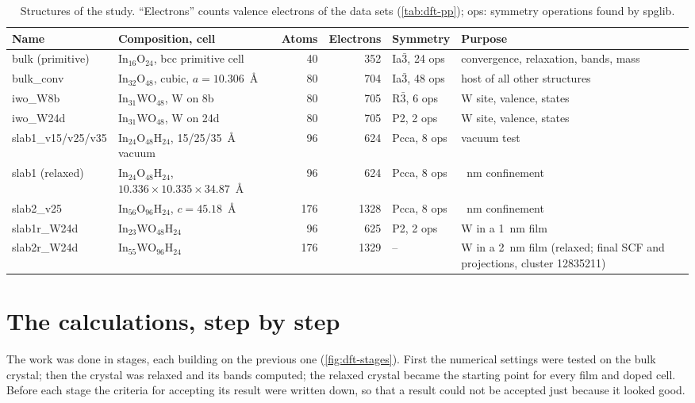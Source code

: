 \begin{table}[htbp]\centering\footnotesize
\caption{Structures of the study. ``Electrons'' counts valence electrons of the data sets (\cref{tab:dft-pp}); ops:
symmetry operations found by spglib.}
\label{tab:dft-structures}
\begin{tabularx}{\linewidth}{@{}l>{\raggedright\arraybackslash}Xrrl>{\raggedright\arraybackslash}p{3.6cm}@{}}
\toprule
Name & Composition, cell & Atoms & Electrons & Symmetry & Purpose \\
\midrule
bulk (primitive) & In$_{16}$O$_{24}$, bcc primitive cell & 40 & 352 & Ia$\bar{3}$, 24 ops & convergence, relaxation, bands, mass \\
bulk\_conv & In$_{32}$O$_{48}$, cubic, $a = 10.306$~\AA & 80 & 704 & Ia$\bar{3}$, 48 ops & host of all other structures \\
iwo\_W8b & In$_{31}$WO$_{48}$, W on 8b & 80 & 705 & R$\bar{3}$, 6 ops & W site, valence, states \\
iwo\_W24d & In$_{31}$WO$_{48}$, W on 24d & 80 & 705 & P2, 2 ops & W site, valence, states \\
slab1\_v15/v25/v35 & In$_{24}$O$_{48}$H$_{24}$, 15/25/35~\AA{} vacuum & 96 & 624 & Pcca, 8 ops & vacuum test \\
slab1 (relaxed) & In$_{24}$O$_{48}$H$_{24}$, $10.336\times10.335\times34.87$~\AA & 96 & 624 & Pcca, 8 ops & 1~nm confinement \\
slab2\_v25 & In$_{56}$O$_{96}$H$_{24}$, $c = 45.18$~\AA & 176 & 1328 & Pcca, 8 ops & 2~nm confinement \\
slab1r\_W24d & In$_{23}$WO$_{48}$H$_{24}$ & 96 & 625 & P2, 2 ops & W in a 1~nm film \\
slab2r\_W24d & In$_{55}$WO$_{96}$H$_{24}$ & 176 & 1329 & -- & W in a 2~nm film (relaxed; final SCF and projections, cluster 12835211) \\
\bottomrule
\end{tabularx}
\end{table}

\section{The calculations, step by step}
\label{sec:dft-calcs}

\begin{dftplain}
The work was done in stages, each building on the previous one (\cref{fig:dft-stages}). First the numerical settings
were tested on the bulk crystal; then the crystal was relaxed and its bands computed; the relaxed crystal became the
starting point for every film and doped cell. Before each stage the criteria for accepting its result were written down,
so that a result could not be accepted just because it looked good.
\end{dftplain}


